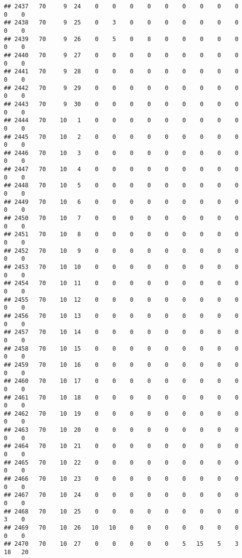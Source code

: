 \documentclass[]{article}
\begin{document}
\begin{verbatim}
## 2437   70     9  24    0    0    0    0    0    0    0    0    0    0    0
## 2438   70     9  25    0    3    0    0    0    0    0    0    0    0    0
## 2439   70     9  26    0    5    0    8    0    0    0    0    0    0    0
## 2440   70     9  27    0    0    0    0    0    0    0    0    0    0    0
## 2441   70     9  28    0    0    0    0    0    0    0    0    0    0    0
## 2442   70     9  29    0    0    0    0    0    0    0    0    0    0    0
## 2443   70     9  30    0    0    0    0    0    0    0    0    0    0    0
## 2444   70    10   1    0    0    0    0    0    0    0    0    0    0    0
## 2445   70    10   2    0    0    0    0    0    0    0    0    0    0    0
## 2446   70    10   3    0    0    0    0    0    0    0    0    0    0    0
## 2447   70    10   4    0    0    0    0    0    0    0    0    0    0    0
## 2448   70    10   5    0    0    0    0    0    0    0    0    0    0    0
## 2449   70    10   6    0    0    0    0    0    0    0    0    0    0    0
## 2450   70    10   7    0    0    0    0    0    0    0    0    0    0    0
## 2451   70    10   8    0    0    0    0    0    0    0    0    0    0    0
## 2452   70    10   9    0    0    0    0    0    0    0    0    0    0    0
## 2453   70    10  10    0    0    0    0    0    0    0    0    0    0    0
## 2454   70    10  11    0    0    0    0    0    0    0    0    0    0    0
## 2455   70    10  12    0    0    0    0    0    0    0    0    0    0    0
## 2456   70    10  13    0    0    0    0    0    0    0    0    0    0    0
## 2457   70    10  14    0    0    0    0    0    0    0    0    0    0    0
## 2458   70    10  15    0    0    0    0    0    0    0    0    0    0    0
## 2459   70    10  16    0    0    0    0    0    0    0    0    0    0    0
## 2460   70    10  17    0    0    0    0    0    0    0    0    0    0    0
## 2461   70    10  18    0    0    0    0    0    0    0    0    0    0    0
## 2462   70    10  19    0    0    0    0    0    0    0    0    0    0    0
## 2463   70    10  20    0    0    0    0    0    0    0    0    0    0    0
## 2464   70    10  21    0    0    0    0    0    0    0    0    0    0    0
## 2465   70    10  22    0    0    0    0    0    0    0    0    0    0    0
## 2466   70    10  23    0    0    0    0    0    0    0    0    0    0    0
## 2467   70    10  24    0    0    0    0    0    0    0    0    0    0    0
## 2468   70    10  25    0    0    0    0    0    0    0    0    0    3    0
## 2469   70    10  26   10   10    0    0    0    0    0    0    0    0    0
## 2470   70    10  27    0    0    0    0    0    5   15    5    3   18   20

\end{verbatim}
\end{document}
